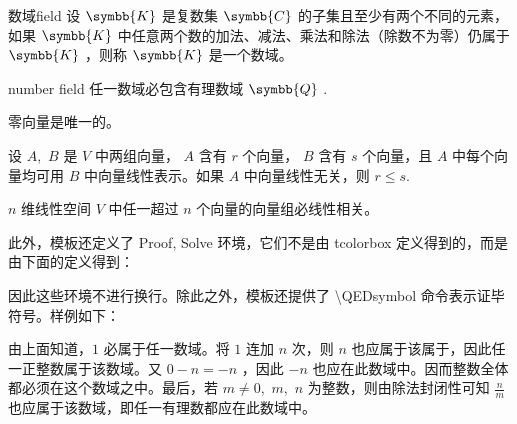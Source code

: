 \documentclass{gunote}
\begin{document}
\begin{Definition}{数域}{field}
  设 $\symbb{K}$ 是复数集 $\symbb{C}$ 的子集且至少有两个不同的元素，如果 $\symbb{K}$ 中任意两个数的加法、减法、乘法和除法（除数不为零）仍属于 $\symbb{K}$ ，则称 $\symbb{K}$ 是一个数域。
\end{Definition}
\begin{Theorem}{}{number field}
  任一数域必包含有理数域 $\symbb{Q}$ .
\end{Theorem}
\begin{Proposition}{}{}
  零向量是唯一的。
\end{Proposition}
\begin{Lemma}{}{}
  设 $A$,\ $B$ 是 $V$ 中两组向量， $A$ 含有 $r$ 个向量， $B$ 含有 $s$ 个向量，且 $A$ 中每个向量均可用 $B$ 中向量线性表示。如果 $A$ 中向量线性无关，则 $r\leq s$.
\end{Lemma}
\begin{Corollary}{}{}
  $n$ 维线性空间 $V$ 中任一超过 $n$ 个向量的向量组必线性相关。
\end{Corollary}
此外，模板还定义了 \textsf{Proof}, \textsf{Solve} 环境，它们不是由 \textsf{tcolorbox} 定义得到的，而是由下面的定义得到：
\begin{Code*}[latex]
\newcommand{\QEDsymbol}{\hfill$\square$}
\newenvironment{Proof}{\textbf{证：}}{\QEDsymbol} %
\newenvironment{Solve}{\textbf{解：}}{} %
\end{Code*}
因此这些环境不进行换行。除此之外，模板还提供了 \textsf{\backslash QEDsymbol} 命令表示证毕符号。样例如下：

\begin{Proof}
  由上面知道，$1$ 必属于任一数域。将 $1$ 连加 $n$ 次，则 $n$ 也应属于该属于，因此任一正整数属于该数域。又 $0-n=-n$ ，因此 $-n$ 也应在此数域中。因而整数全体都必须在这个数域之中。最后，若 $m\neq 0$,\ $m$,\ $n$ 为整数，则由除法封闭性可知 $\frac{n}{m}$ 也应属于该数域，即任一有理数都应在此数域中。
\end{Proof}
\end{document}
